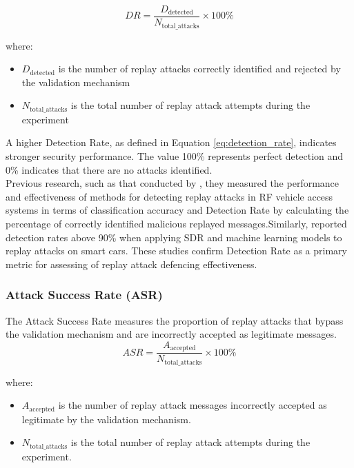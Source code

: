 \documentclass[a4paper,man,12pt]{article}
\begin{document}
\begin{equation}
DR = \frac{D_{\text{detected}}}{N_{\text{total\_attacks}}} \times 100\%
\label{eq:detection_rate}
\end{equation}

where:
\begin{itemize}
    \item $D_{\text{detected}}$ is the number of replay attacks correctly 
    identified and rejected by the validation mechanism
    \item $N_{\text{total\_attacks}}$ is the total number of replay attack 
    attempts during the experiment
\end{itemize}

A higher Detection Rate, as defined in Equation \ref{eq:detection_rate}, indicates stronger security performance. The value 100\% represents perfect detection and 0\% indicates that there are no attacks identified.\\ 

Previous research, such as that conducted by \textcite{003}, they measured the performance and effectiveness of methods for detecting replay attacks in RF vehicle access systems in terms of classification accuracy and Detection Rate by calculating the percentage of correctly identified malicious replayed messages.Similarly, \textcite{006B} reported detection rates above 90\% when applying SDR 
and machine learning models to replay attacks on smart cars. These studies 
confirm Detection Rate as a primary metric for assessing of replay attack 
defencing effectiveness.\\

\subsubsection{Attack Success Rate (ASR)}

The Attack Success Rate measures the proportion of replay attacks that bypass the validation mechanism and are incorrectly accepted as legitimate messages.\\ 

\begin{equation}
ASR = \frac{A_{\text{accepted}}}{N_{\text{total\_attacks}}} \times 100\%
\label{eq:attack_success_rate}
\end{equation}
 
where:
\begin{itemize}
    \item $A_{\text{accepted}}$ is the number of replay attack messages incorrectly accepted as legitimate by the validation mechanism.
    \item $N_{\text{total\_attacks}}$ is the total number of replay attack attempts during the experiment.
\end{itemize}
 
\end{document}
